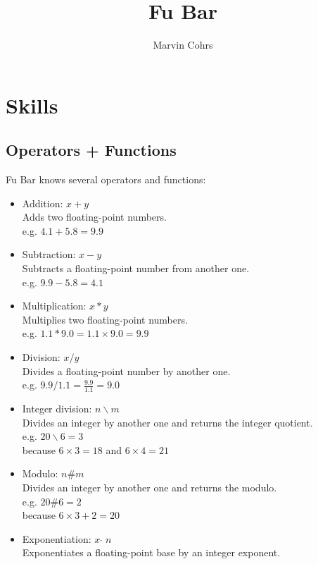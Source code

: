 \documentclass[12pt,a4paper]{article}
\author{Marvin Cohrs}
\title{Fu Bar}
\begin{document}
	\maketitle
	\tableofcontents
	
	\section{Skills}
	\subsection{Operators + Functions}
	
	Fu Bar knows several operators and functions:
	
	\begin{itemize}
		\item Addition: $x + y$\\
			  Adds two floating-point numbers.\\
			  e.g. $4.1 + 5.8 = 9.9$
		\item Subtraction: $x - y$\\
			  Subtracts a floating-point number from another one.\\
			  e.g. $9.9 - 5.8 = 4.1$
		\item Multiplication: $x * y$\\
			  Multiplies two floating-point numbers.\\
			  e.g. $1.1 * 9.0 = 1.1 \times 9.0 = 9.9$
		\item Division: $x / y$\\
			  Divides a floating-point number by another one.\\
			  e.g. $9.9 / 1.1 = \frac{9.9}{1.1} = 9.0$
		\item Integer division: $n \backslash m$\\
			  Divides an integer by another one and returns the integer quotient.\\
			  e.g. $20 \backslash 6 = 3$\\
			  because $6\times3=18$ and $6\times4=21$
		\item Modulo: $n \# m$\\
			  Divides an integer by another one and returns the modulo.\\
			  e.g. $20 \# 6 = 2$\\
			  because $6\times3+2=20$
		\item Exponentiation: $x \; \hat{ } \; n$\\
			  Exponentiates a floating-point base by an integer exponent.\\

\end{itemize}
\end{document}
